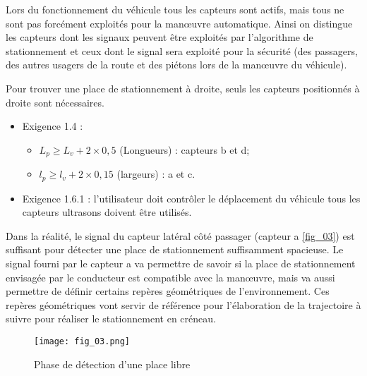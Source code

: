Lors du fonctionnement du véhicule tous les capteurs sont actifs, mais tous ne sont pas forcément exploités
pour la manœuvre automatique. Ainsi on distingue les capteurs dont les signaux peuvent être exploités par
l’algorithme de stationnement et ceux dont le signal sera exploité pour la sécurité (des passagers, des autres
usagers de la route et des piétons lors de la manœuvre du véhicule).

\ifprof
\begin{corrige}
Pour trouver une place de stationnement à droite, seuls les capteurs positionnés à droite sont nécessaires. 
\begin{itemize}
\item Exigence 1.4 :
\begin{itemize}
\item $L_p \geq L_v + 2 \times 0,5 $ (Longueurs) : capteurs b et d;
\item $l_p \geq l_v + 2 \times 0,15 $ (largeurs) : a et c. 
\end{itemize} 
\end{itemize}

\begin{itemize}
\item Exigence 1.6.1 : l'utilisateur doit contrôler le déplacement du véhicule tous les capteurs ultrasons doivent être utilisés.
\end{itemize}

\end{corrige}
\else
\fi

Dans la réalité, le signal du capteur latéral côté passager (capteur a \autoref{fig_03}) est suffisant pour détecter une
place de stationnement suffisamment spacieuse. Le signal fourni par le capteur a va permettre de savoir si la
place de stationnement envisagée par le conducteur est compatible avec la manœuvre, mais va aussi permettre
de définir certains repères géométriques de l’environnement. Ces repères géométriques vont servir de référence
pour l’élaboration de la trajectoire à suivre pour réaliser le stationnement en créneau.


\begin{figure}[H]
\centering
\texttt{[image: fig\_03.png]}
\caption{Phase de détection d’une place libre \label{fig_03}}
\end{figure}

